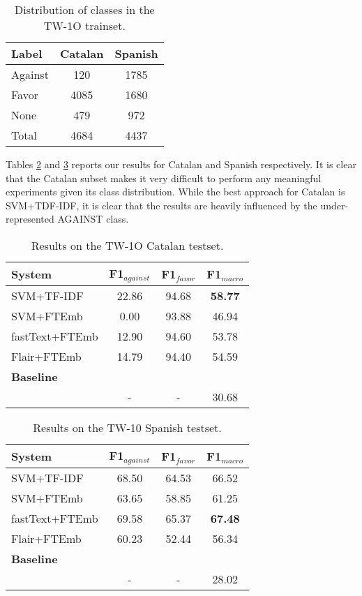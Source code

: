 \documentclass[10pt, a4paper]{article}
\begin{document}
\begin{table}[!ht]
\centering
\begin{tabular}{lcc} \hline
      Label & Catalan & Spanish\\ \hline
    Against & 120 & 1785 \\
      Favor & 4085 & 1680 \\
     None & 479 & 972 \\ \hline
      Total & 4684 & 4437 \\ \hline
\end{tabular}
\caption{Distribution of classes in the TW-1O trainset.}\label{tab:twdatasetdistr}
\end{table}

Tables \ref{tab:result_tw1o_ca} and \ref{tab:result_tw1o_es} reports our results for Catalan and Spanish respectively. It is clear that the Catalan subset makes it very difficult to perform any meaningful experiments given its class distribution. While the best approach for Catalan is SVM+TDF-IDF, it is clear that the results are heavily influenced by the under-represented AGAINST class.

\begin{table}[!ht]\small
\centering
\begin{tabular}{lccc} \hline
\textbf{System} & F1$_{against}$ & F1$_{favor}$ & F1$_{macro}$\\ \hline
SVM+TF-IDF & 22.86 & 94.68 & \textbf{58.77} \\
SVM+FTEmb & 0.00 & 93.88 & 46.94 \\
fastText+FTEmb & 12.90 & 94.60 & 53.78 \\
Flair+FTEmb & 14.79 & 94.40 & 54.59 \\ \hline
\textbf{Baseline} \\
\scriptsize{\cite{Cuquerella2018CriCaTM}} & - & - & 30.68 \\  \hline
\end{tabular}
\caption{Results on the TW-1O Catalan testset.}\label{tab:result_tw1o_ca}
\end{table}

\begin{table}[!ht]\small
\centering
\begin{tabular}{lccc} \hline
\textbf{System} & F1$_{against}$ & F1$_{favor}$ & F1$_{macro}$ \\ \hline
SVM+TF-IDF & 68.50 & 64.53 & 66.52 \\
SVM+FTEmb & 63.65 & 58.85 & 61.25 \\
fastText+FTEmb & 69.58 & 65.37 & \textbf{67.48} \\
Flair+FTEmb & 60.23 & 52.44 & 56.34 \\ \hline
\textbf{Baseline} \\
\cite{Segura-Bedmar18} & - & - & 28.02 \\ \hline
\end{tabular}
\caption{Results on the TW-10 Spanish testset.}\label{tab:result_tw1o_es}
\end{table}
\end{document}
